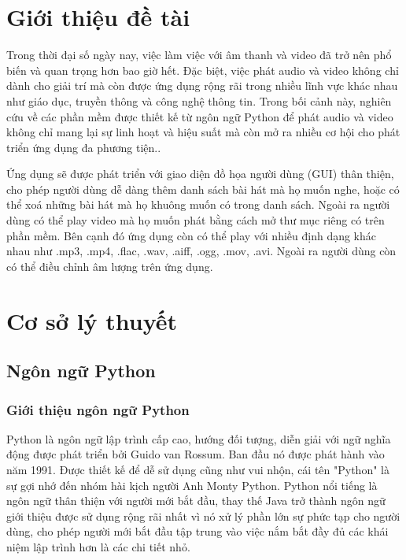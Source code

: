 \documentclass[a4paper]{article}
\begin{document}
\thispagestyle{empty}

\newpage
\tableofcontents
\newpage



\section{Giới thiệu đề tài}
    \hspace*{0.5cm}\Large Trong thời đại số ngày nay, việc làm việc với âm thanh và video đã trở nên phổ biến và quan trọng hơn bao giờ hết. Đặc biệt, việc phát audio và video không chỉ dành cho giải trí mà còn được ứng dụng rộng rãi trong nhiều lĩnh vực khác nhau như giáo dục, truyền thông và công nghệ thông tin. Trong bối cảnh này, nghiên cứu về các phần mềm được thiết kế từ ngôn ngữ Python để phát audio và video không chỉ mang lại sự linh hoạt và hiệu suất mà còn mở ra nhiều cơ hội cho phát triển ứng dụng đa phương tiện..

    \hspace*{0.5cm}\Large Ứng dụng sẽ được phát triển với giao diện đồ họa người dùng (GUI) thân thiện, cho phép người dùng dễ dàng thêm danh sách bài hát mà họ muốn nghe, hoặc có thể xoá những bài hát mà họ khuông muốn có trong danh sách. Ngoài ra người dùng có thể play video mà họ muốn phát bằng cách mở thư mục riêng có trên phần mềm. Bên cạnh đó ứng dụng còn có thể play với nhiều định dạng khác nhau như .mp3, .mp4, .flac, .wav, .aiff, .ogg, .mov, .avi. Ngoài ra người dùng còn có thể điều chỉnh âm lượng trên ứng dụng.

\newpage

\section{Cơ sở lý thuyết}
\subsection{Ngôn ngữ Python}
\subsubsection{Giới thiệu ngôn ngữ Python}
    \hspace*{0.5cm}\Large Python là ngôn ngữ lập trình cấp cao, hướng đối tượng, diễn giải với ngữ nghĩa động được phát triển bởi Guido van Rossum. Ban đầu nó được phát hành vào năm 1991. Được thiết kế để dễ sử dụng cũng như vui nhộn, cái tên "Python" là sự gợi nhớ đến nhóm hài kịch người Anh Monty Python. Python nổi tiếng là ngôn ngữ thân thiện với người mới bắt đầu, thay thế Java trở thành ngôn ngữ giới thiệu được sử dụng rộng rãi nhất vì nó xử lý phần lớn sự phức tạp cho người dùng, cho phép người mới bắt đầu tập trung vào việc nắm bắt đầy đủ các khái niệm lập trình hơn là các chi tiết nhỏ.
\end{document}
